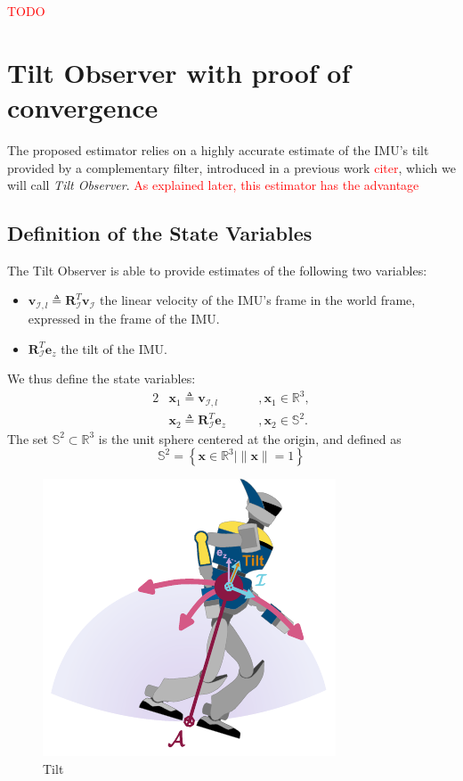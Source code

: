 \documentclass{IJCAS}
\begin{document}
\textcolor{red}{TODO}

\section{Tilt Observer with proof of convergence}
The proposed estimator relies on a highly accurate estimate of the IMU's tilt provided by a complementary filter, introduced in a previous work \textcolor{red}{citer}, which we will call \emph{Tilt Observer}. \textcolor{red}{As explained later, this estimator has the advantage }

\subsection{Definition of the State Variables}
The Tilt Observer is able to provide estimates of the following two variables: 
\begin{itemize}
    \item $\boldsymbol{v}_{\mathcal{I}, l} \triangleq \boldsymbol{R}^{T}_{\mathcal{I}} \boldsymbol{v}_{\mathcal{I}} $ the linear velocity of the IMU's frame in the world frame, expressed in the frame of the IMU.
    \item $\boldsymbol{R}^{T}_{\mathcal{I}} \boldsymbol{e}_z$ the tilt of the IMU.
\end{itemize}
We thus define the state variables: 
\begin{alignat}{2}
&\boldsymbol{x}_{1} \triangleq \boldsymbol{v}_{\mathcal{I}, l} \quad &&, \boldsymbol{x}_{1} \in \mathbb{R}^{3}, \label{eq:x1} \\
&\boldsymbol{x}_{2} \triangleq \boldsymbol{R}^{T}_{\mathcal{I}} \boldsymbol{e}_z \quad &&, \boldsymbol{x}_{2} \in \mathbb{S}^{2}. \label{eq:x2}
\end{alignat} 
The set $\mathbb{S}^{2} \subset \mathbb{R}^{3}$ is the unit sphere centered at the origin, and defined as
\begin{equation}
    \mathbb{S}^{2} = \left\{ \boldsymbol{x} \in \mathbb{R}^{3} \vert \lVert \boldsymbol{x} \rVert=1 \right\}
\end{equation}

\begin{figure}[!t]
\begin{center}
\includegraphics[width=0.5\columnwidth]{Uploaded/Images/tilt.pdf} 
\vskip -0.5pc
\caption{Tilt}\label{fig:tilt}
\end{center}
\vskip -1.5pc
\end{figure}
\end{document}
